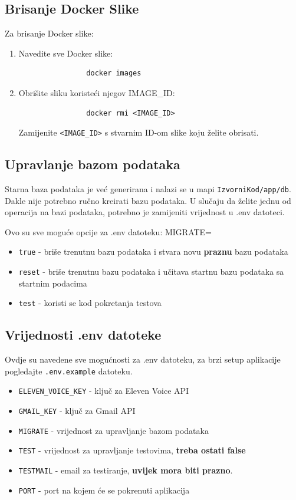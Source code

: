 		\subsection*{Brisanje Docker Slike}
		Za brisanje Docker slike:
		\begin{enumerate}
			\item Navedite sve Docker slike:
			\begin{verbatim}
				docker images
			\end{verbatim}
			\item Obrišite sliku koristeći njegov IMAGE\_ID:
			\begin{verbatim}
				docker rmi <IMAGE_ID>
			\end{verbatim}
			Zamijenite \texttt{<IMAGE\_ID>} s stvarnim ID-om slike koju želite obrisati.
		\end{enumerate}

		\subsection*{Upravlanje bazom podataka}
			Starna baza podataka je već generirana i nalazi se u mapi \texttt{IzvorniKod/app/db}.
			Dakle nije potrebno ručno kreirati bazu podataka.
			U slučaju da želite jednu od operacija na bazi podataka, potrebno je zamijeniti vrijednost u .env datoteci.

			Ovo su sve moguće opcije za .env datoteku:
			MIGRATE=
			\begin{itemize}
				\item \texttt{true} - briše trenutnu bazu podataka i stvara novu \textbf{praznu} bazu podataka
				\item \texttt{reset} - briše trenutnu bazu podataka i učitava startnu bazu podataka sa startnim podacima
				\item \texttt{test} - koristi se kod pokretanja testova 
			\end{itemize}
	
		\subsection*{Vrijednosti .env datoteke}
			Ovdje su navedene sve mogućnosti za .env datoteku, za brzi setup aplikacije pogledajte \texttt{.env.example} datoteku.
			\begin{itemize}
				\item \texttt{ELEVEN\_VOICE\_KEY} - ključ za Eleven Voice API
				\item \texttt{GMAIL\_KEY} - ključ za Gmail API
				\item \texttt{MIGRATE} - vrijednost za upravljanje bazom podataka
				\item \texttt{TEST} - vrijednost za upravljanje testovima, \textbf{treba ostati false}
				\item \texttt{TESTMAIL} - email za testiranje, \textbf{uvijek mora biti prazno}.
				\item \texttt{PORT} - port na kojem će se pokrenuti aplikacija
			\end{itemize}
		
		\eject
